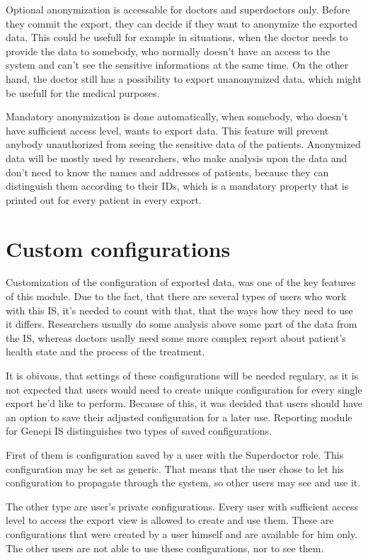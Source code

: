 \documentclass[thesis=B,english]{FITthesis}[2012/10/20]
\begin{document}
Optional anonymization is accessable for doctors and superdoctors only. Before they commit the export, they can decide if they want to anonymize the exported data. This could be usefull for example in situations, when the doctor needs to provide the data to somebody, who normally doesn't have an access to the system and can't see the sensitive informations at the same time. On the other hand, the doctor still has a possibility to export unanonymized data, which might be usefull for the medical purposes.

Mandatory anonymization is done automatically, when somebody, who doesn't have sufficient access level, wants to export data. This feature will prevent anybody unauthorized from seeing the sensitive data of the patients. Anonymized data will be mostly used by researchers, who make analysis upon the data and don't need to know the names and addresses of patients, because they can distinguish them according to their IDs, which is a mandatory property that is printed out for every patient in every export.
\section{Custom configurations}
Customization of the configuration of exported data, was one of the key features of this module. Due to the fact, that there are several types of users who work with this IS, it's needed to count with that, that the ways how they need to use it differs. Researchers usually do some analysis above some part of the data from the IS, whereas doctors usally need some more complex report about patient's health state and the process of the treatment.

It is obivous, that settings of these configurations will be needed regulary, as it is not expected that users would need to create unique configuration for every single export he'd like to perform. Because of this, it was decided that users should have an option to save their adjusted configuration for a later use. Reporting module for Genepi IS distinguishes two types of saved configurations.

First of them is configuration saved by a user with the Superdoctor role. This configuration may be set as generic. That means that the user chose to let his configuration to propagate through the system, so other users may see and use it.

The other type are user's private configurations. Every user with sufficient access level to access the export view is allowed to create and use them. These are configurations that were created by a user himself and are available for him only. The other users are not able to use these configurations, nor to see them.
\end{document}
